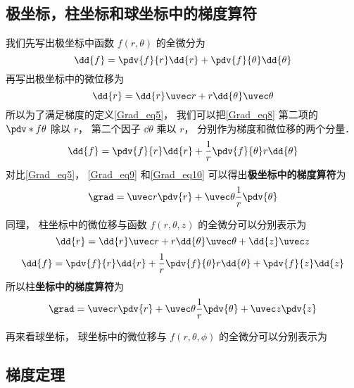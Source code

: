 \subsection{极坐标，柱坐标和球坐标中的梯度算符}

我们先写出极坐标中函数 $f(r,\theta)$ 的全微分为
\begin{equation}\label{Grad_eq8}
\dd{f} = \pdv{f}{r} \dd{r} + \pdv{f}{\theta} \dd{\theta}
\end{equation}
再写出极坐标中的微位移为%
\begin{equation}\label{Grad_eq9}
\dd{r} = \dd{r} \uvec r + r \dd{\theta} \uvec \theta
\end{equation}
所以为了满足梯度的定义\autoref{Grad_eq5}， 我们可以把\autoref{Grad_eq8} 第二项的 $\pdv*{f}{\theta}$ 除以 $r$， 第二个因子 $\dd{\theta}$ 乘以 $r$， 分别作为梯度和微位移的两个分量．
\begin{equation}\label{Grad_eq10}
\dd{f} = \pdv{f}{r} \dd{r} + \frac 1r \pdv{f}{\theta}  r\dd{\theta}
\end{equation}
对比\autoref{Grad_eq5}， \autoref{Grad_eq9} 和\autoref{Grad_eq10} 可以得出\textbf{极坐标中的梯度算符}为
\begin{equation}
\grad = \uvec r \pdv{r} + \uvec \theta \frac 1r \pdv{\theta}
\end{equation}

同理， 柱坐标中的微位移与函数 $f(r,\theta, z)$ 的全微分可以分别表示为
\begin{equation}
\dd{r} = \dd{r} \uvec r + r\dd{\theta} \uvec \theta + \dd{z} \uvec z
\end{equation}
\begin{equation}
\dd{f} = \pdv{f}{r} \dd{r} + \frac 1r \pdv{f}{\theta}  r\dd{\theta} + \pdv{f}{z} \dd{z}
\end{equation}
所以柱\textbf{坐标中的梯度算符}为
\begin{equation}
\grad = \uvec r \pdv{r} + \uvec \theta \frac 1r \pdv{\theta} + \uvec z \pdv{z}
\end{equation}

再来看球坐标， 球坐标中的微位移与 $f(r,\theta,\phi)$ 的全微分可以分别表示为



\subsection{梯度定理}

